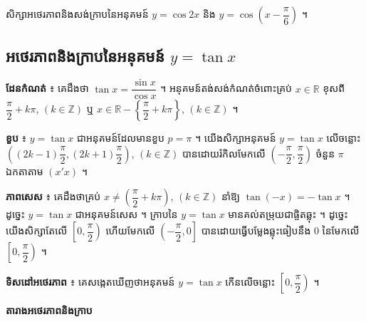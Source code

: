 \begin{pro}
សិក្សាអថេរភាពនិងសង់ក្រាបនៃអនុគមន៍ $y = \cos 2x$ និង $y = \cos\left(x - \dfrac{\pi}{6}\right)$ ។
\end{pro}

\subsection{អថេរភាពនិងក្រាបនៃអនុគមន៍ \texorpdfstring{$y = \tan x$}{y = tan x}}

\textbf{ដែនកំណត់} ៖ គេដឹងថា $\tan x = \dfrac{\sin x}{\cos x}$ ។ អនុគមន៍តង់សង់កំណត់ចំពោះគ្រប់ $x \in \mathbb{R}$ ខុសពី $\dfrac{\pi}{2} + k\pi$, $(k \in \mathbb{Z})$ ឬ $x \in \mathbb{R} - \left\{\dfrac{\pi}{2} + k\pi\right\}$, $(k \in \mathbb{Z})$ ។

\textbf{ខួប} ៖ $y = \tan x$ ជាអនុគមន៍ដែលមានខួប $p = \pi$ ។ យើងសិក្សាអនុគមន៍ $y = \tan x$ លើចន្លោះ $\left((2k - 1)\dfrac{\pi}{2}, (2k + 1)\dfrac{\pi}{2}\right)$, $(k \in \mathbb{Z})$ បានដោយរំកិលមែកលើ $\left(-\dfrac{\pi}{2}, \dfrac{\pi}{2}\right)$ ចំនួន $\pi$ ឯកតាតាម $(x'x)$ ។

\textbf{ភាពសេស} ៖ គេដឹងថាគ្រប់ $x \ne \left(\dfrac{\pi}{2} + k\pi\right)$, $(k \in \mathbb{Z})$ នាំឱ្យ $\tan(-x) = -\tan x$ ។ ដូច្នេះ $y = \tan x$ ជាអនុគមន៍សេស ។ ក្រាបនៃ $y = \tan x$ មានគល់តម្រុយជាផ្ចិតឆ្លុះ ។ ដូច្នេះយើងសិក្សាតែលើ $\left[0, \dfrac{\pi}{2}\right)$ ហើយមែកលើ $\left(-\dfrac{\pi}{2}, 0\right]$ បានដោយធ្វើបម្លែងឆ្លុះធៀបនឹង $0$ នៃមែកលើ $\left[0, \dfrac{\pi}{2}\right)$ ។

\textbf{ទិសដៅអថេរភាព} ៖ គេសង្កេតឃើញថាអនុគមន៍ $y = \tan x$ កើនលើចន្លោះ $\left[0, \dfrac{\pi}{2}\right)$ ។

\textbf{តារាងអថេរភាពនិងក្រាប}
\begin{center}

\end{center}

